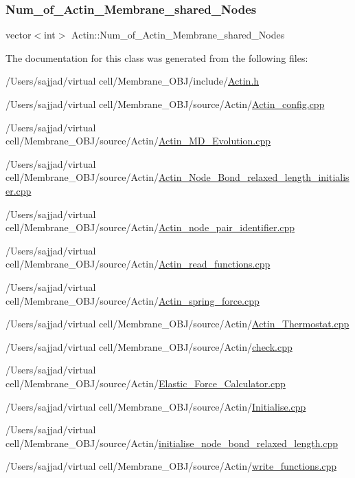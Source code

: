 \subsubsection{\texorpdfstring{Num\_of\_Actin\_Membrane\_shared\_Nodes}{Num\_of\_Actin\_Membrane\_shared\_Nodes}}
{\footnotesize\ttfamily vector$<$int$>$ Actin\+::\+Num\+\_\+of\+\_\+\+Actin\+\_\+\+Membrane\+\_\+shared\+\_\+\+Nodes}



The documentation for this class was generated from the following files\+:\begin{DoxyCompactItemize}
\item 
/\+Users/sajjad/virtual cell/\+Membrane\+\_\+\+O\+B\+J/include/\mbox{\hyperlink{Actin_8h}{Actin.\+h}}\item 
/\+Users/sajjad/virtual cell/\+Membrane\+\_\+\+O\+B\+J/source/\+Actin/\mbox{\hyperlink{Actin__config_8cpp}{Actin\+\_\+config.\+cpp}}\item 
/\+Users/sajjad/virtual cell/\+Membrane\+\_\+\+O\+B\+J/source/\+Actin/\mbox{\hyperlink{Actin__MD__Evolution_8cpp}{Actin\+\_\+\+M\+D\+\_\+\+Evolution.\+cpp}}\item 
/\+Users/sajjad/virtual cell/\+Membrane\+\_\+\+O\+B\+J/source/\+Actin/\mbox{\hyperlink{Actin__Node__Bond__relaxed__length__initialiser_8cpp}{Actin\+\_\+\+Node\+\_\+\+Bond\+\_\+relaxed\+\_\+length\+\_\+initialiser.\+cpp}}\item 
/\+Users/sajjad/virtual cell/\+Membrane\+\_\+\+O\+B\+J/source/\+Actin/\mbox{\hyperlink{Actin__node__pair__identifier_8cpp}{Actin\+\_\+node\+\_\+pair\+\_\+identifier.\+cpp}}\item 
/\+Users/sajjad/virtual cell/\+Membrane\+\_\+\+O\+B\+J/source/\+Actin/\mbox{\hyperlink{Actin__read__functions_8cpp}{Actin\+\_\+read\+\_\+functions.\+cpp}}\item 
/\+Users/sajjad/virtual cell/\+Membrane\+\_\+\+O\+B\+J/source/\+Actin/\mbox{\hyperlink{Actin__spring__force_8cpp}{Actin\+\_\+spring\+\_\+force.\+cpp}}\item 
/\+Users/sajjad/virtual cell/\+Membrane\+\_\+\+O\+B\+J/source/\+Actin/\mbox{\hyperlink{Actin__Thermostat_8cpp}{Actin\+\_\+\+Thermostat.\+cpp}}\item 
/\+Users/sajjad/virtual cell/\+Membrane\+\_\+\+O\+B\+J/source/\+Actin/\mbox{\hyperlink{Actin_2check_8cpp}{check.\+cpp}}\item 
/\+Users/sajjad/virtual cell/\+Membrane\+\_\+\+O\+B\+J/source/\+Actin/\mbox{\hyperlink{Actin_2Elastic__Force__Calculator_8cpp}{Elastic\+\_\+\+Force\+\_\+\+Calculator.\+cpp}}\item 
/\+Users/sajjad/virtual cell/\+Membrane\+\_\+\+O\+B\+J/source/\+Actin/\mbox{\hyperlink{Actin_2Initialise_8cpp}{Initialise.\+cpp}}\item 
/\+Users/sajjad/virtual cell/\+Membrane\+\_\+\+O\+B\+J/source/\+Actin/\mbox{\hyperlink{initialise__node__bond__relaxed__length_8cpp}{initialise\+\_\+node\+\_\+bond\+\_\+relaxed\+\_\+length.\+cpp}}\item 
/\+Users/sajjad/virtual cell/\+Membrane\+\_\+\+O\+B\+J/source/\+Actin/\mbox{\hyperlink{Actin_2write__functions_8cpp}{write\+\_\+functions.\+cpp}}\end{DoxyCompactItemize}
